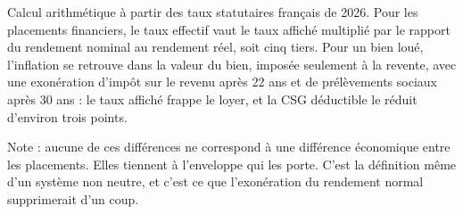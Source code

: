 Calcul arithmétique à partir des taux statutaires français de 2026. Pour les placements financiers, le taux effectif vaut le taux affiché multiplié par le rapport du rendement nominal au rendement réel, soit cinq tiers. Pour un bien loué, l'inflation se retrouve dans la valeur du bien, imposée seulement à la revente, avec une exonération d'impôt sur le revenu après 22 ans et de prélèvements sociaux après 30 ans : le taux affiché frappe le loyer, et la CSG déductible le réduit d'environ trois points.\par Note : aucune de ces différences ne correspond à une différence économique entre les placements. Elles tiennent à l'enveloppe qui les porte. C'est la définition même d'un système non neutre, et c'est ce que l'exonération du rendement normal supprimerait d'un coup.
